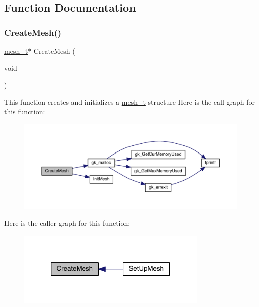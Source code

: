 \subsection{Function Documentation}
\mbox{\label{a00380_aec1a4bd83e832be7befbf6b03e9513ad}} 
\subsubsection{\texorpdfstring{Create\+Mesh()}{CreateMesh()}}
{\footnotesize\ttfamily \hyperlink{a00738}{mesh\+\_\+t}$\ast$ Create\+Mesh (\begin{DoxyParamCaption}\item[{void}]{ }\end{DoxyParamCaption})}

This function creates and initializes a \hyperlink{a00738}{mesh\+\_\+t} structure Here is the call graph for this function\+:\nopagebreak
\begin{figure}[H]
\begin{center}
\leavevmode
\includegraphics[width=350pt]{a00380_aec1a4bd83e832be7befbf6b03e9513ad_cgraph}
\end{center}
\end{figure}
Here is the caller graph for this function\+:\nopagebreak
\begin{figure}[H]
\begin{center}
\leavevmode
\includegraphics[width=258pt]{a00380_aec1a4bd83e832be7befbf6b03e9513ad_icgraph}
\end{center}
\end{figure}
\mbox{\label{a00380_a82cd62ea70eaae4395fee538d40cf12b}} 
